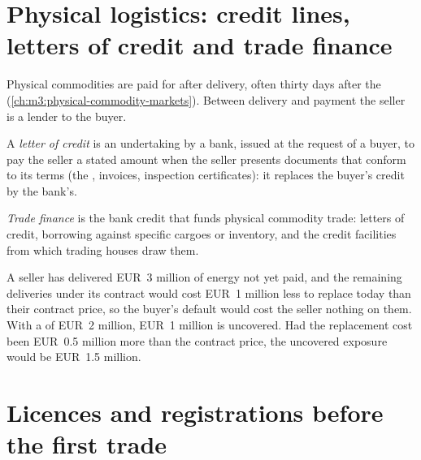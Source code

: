 \section{Physical logistics: credit lines, letters of credit and trade finance}

Physical commodities are paid for after delivery, often thirty days after the 
(\cref{ch:m3:physical-commodity-markets}). Between delivery and payment the seller is a lender to the buyer.

\begin{definition}\label{def:m3:getting-access-commodities-and-power:lc}
A \emph{letter of credit} is an undertaking by a bank, issued at the request of a
buyer, to pay the seller a stated amount when the seller presents documents that conform to its terms (the
, invoices, inspection certificates): it replaces the buyer's credit by the bank's.
\end{definition}

\begin{definition}\label{def:m3:getting-access-commodities-and-power:tf}
\emph{Trade finance} is the bank credit that funds physical commodity trade: letters of
credit, borrowing against specific cargoes or inventory, and the credit facilities from which trading houses
draw them.
\end{definition}

\begin{example}\label{ex:m3:getting-access-commodities-and-power:lc}
A seller has delivered EUR~3 million of energy not yet paid, and the remaining deliveries under its contract
would cost EUR~1 million less to replace today than their contract price, so the buyer's default would cost
the seller nothing on them. With a  of EUR~2 million, EUR~1 million is uncovered. Had the
replacement cost been EUR~0.5 million more than the contract price, the uncovered exposure would be
EUR~1.5 million.
\end{example}

\section{Licences and registrations before the first trade}

